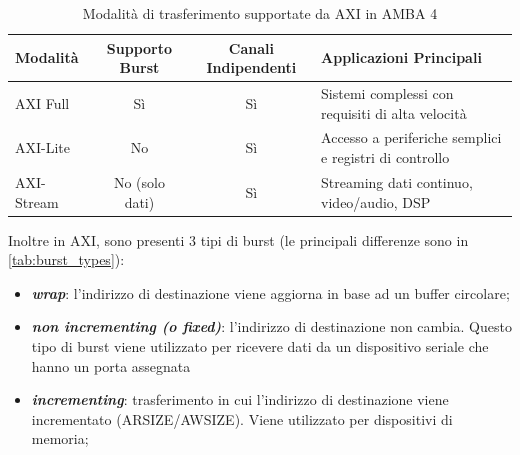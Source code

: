 \documentclass{article}
\begin{document}
\begin{table}[h!]
\centering
\begin{tabular}{|l|c|c|l|}
\hline
\textbf{Modalità} & \textbf{Supporto Burst} & \textbf{Canali Indipendenti} & \textbf{Applicazioni Principali} \\ \hline
AXI Full          & Sì                      & Sì                           & Sistemi complessi con requisiti di alta velocità       \\ \hline
AXI-Lite          & No                      & Sì                           & Accesso a periferiche semplici e registri di controllo \\ \hline
AXI-Stream        & No (solo dati)          & Sì                           & Streaming dati continuo, video/audio, DSP              \\ \hline
\end{tabular}
\caption{Modalità di trasferimento supportate da AXI in AMBA 4}
\label{tab:axi-modes}
\end{table}

Inoltre in AXI, sono presenti $3$ tipi di burst (le principali differenze sono in \cref{tab:burst_types}):
\begin{itemize}
  \item \textbf{\textit{wrap}}: l'indirizzo di destinazione viene aggiorna in base ad un buffer circolare;
  \item \textbf{\textit{non incrementing (o fixed)}}: l'indirizzo di destinazione non cambia. Questo tipo di burst viene utilizzato per ricevere dati da un dispositivo seriale che hanno un porta assegnata
  \item \textbf{\textit{incrementing}}: trasferimento in cui l'indirizzo di destinazione viene incrementato (ARSIZE/AWSIZE). Viene utilizzato per dispositivi di memoria;
\end{itemize}
\end{document}
